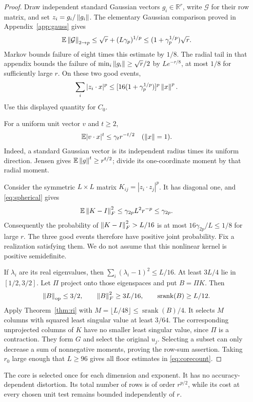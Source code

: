 \documentclass[11pt]{article}
\theoremstyle{remark}\newtheorem{remark}[theorem]{Remark}
\newcommand{\R}{\mathbb R}\newcommand{\E}{\mathbb E}\newcommand{\Prob}{\mathbb P}
\newcommand{\srank}{\operatorname{srank}}\newcommand{\cost}{\operatorname{cost}}
\begin{document}
\begin{proof}
Draw independent standard Gaussian vectors $g_i\in\R^r$, write $\mathcal G$ for their row matrix, and set $z_i=g_i/\left\|g_i\right\|$. The elementary Gaussian comparison proved in Appendix~\ref{app:gauss} gives
\[
 \E\norm{\mathcal G}_{2\to p}\le\sqrt r+(L\gamma_p)^{1/p}
 \le(1+\gamma_p^{1/p})\sqrt r.
\]
Markov bounds failure of eight times this estimate by $1/8$. The radial tail in that appendix bounds the failure of $\min_i\left\|g_i\right\|\ge\sqrt r/2$ by $Le^{-r/8}$, at most $1/8$ for sufficiently large $r$. On these two good events,
\[
 \sum_i|z_i\cdot x|^p
 \le[16(1+\gamma_p^{1/p})]^p\left\|x\right\|^p.
\]
Use this displayed quantity for $C_0$.

For a uniform unit vector $v$ and $t\ge2$,
\begin{equation}\label{eq:spherical}
 \E|v\cdot x|^t\le\gamma_t r^{-t/2}\quad(\norm x=1).
\end{equation}
Indeed, a standard Gaussian vector is its independent radius times its uniform direction. Jensen gives $\E\norm g^t\ge r^{t/2}$; divide its one-coordinate moment by that radial moment.

Consider the symmetric $L\times L$ matrix $K_{ij}=|z_i\cdot z_j|^p$. It has diagonal one, and \eqref{eq:spherical} gives
\[
 \E\norm{K-I}_F^2\le\gamma_{2p}L^2r^{-p}\le\gamma_{2p}.
\]
Consequently the probability of $\left\|K-I\right\|_F^2>L/16$ is at most $16\gamma_{2p}/L\le1/8$ for large $r$. The three good events therefore have positive joint probability. Fix a realization satisfying them. We do not assume that this nonlinear kernel is positive semidefinite.

If $\lambda_i$ are its real eigenvalues, then $\sum_i(\lambda_i-1)^2\le L/16$. At least $3L/4$ lie in $[1/2,3/2]$. Let $\Pi$ project onto those eigenspaces and put $B=\Pi K$. Then
\[
 \norm B_{\op}\le3/2,\qquad \norm B_F^2\ge3L/16,
 \qquad \srank(B)\ge L/12.
\]
Apply Theorem~\ref{thm:ri} with $M=\lfloor L/48\rfloor\le\srank(B)/4$. It selects $M$ columns with squared least singular value at least $3/64$. The corresponding unprojected columns of $K$ have no smaller least singular value, since $\Pi$ is a contraction. They form $G$ and select the original $u_j$. Selecting a subset can only decrease a sum of nonnegative moments, proving the row-sum assertion. Taking $r_0$ large enough that $L\ge96$ gives all floor estimates in \eqref{eq:corecount}.
\end{proof}
The core is selected once for each dimension and exponent. It has no accuracy-dependent distortion. Its total number of rows is of order $r^{p/2}$, while its cost at every chosen unit test remains bounded independently of $r$.
\end{document}

